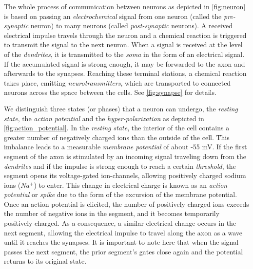 The whole process of communication between neurons as depicted in \autoref{fig:neuron} is based on passing an \emph{electrochemical} signal from one neuron (called the \emph{pre-synaptic} neuron) to many neurons (called \emph{post-synaptic} neurons). A received electrical impulse travels through the neuron and a chemical reaction is triggered to transmit the signal to the next neuron. When a signal is received at the level of the \emph{dendrites}, it is transmitted to the \emph{soma} in the form of an electrical signal. If the accumulated signal is strong enough, it may be forwarded to the axon and afterwards to the synapses. Reaching these terminal stations, a chemical reaction takes place, emitting \emph{neurotransmitters}, which are transported to connected neurons across the space between the cells. See \autoref{fig:synapse} for details.

We distinguish three states (or phases) that a neuron can undergo, the \emph{resting state}, the \emph{action potential} and the \emph{hyper-polarization} as depicted in \autoref{fig:action_potential}. In the \emph{resting state}, the interior of the cell contains a greater number of negatively charged ions than the outside of the cell. This imbalance leads to a measurable \emph{membrane potential} of about -55 mV. If the first segment of the axon is stimulated by an incoming signal traveling down from the \emph{dendrites} and if the impulse is strong enough to reach a certain \emph{threshold}, the segment opens its voltage-gated ion-channels, allowing positively charged sodium ions ($Na^{+}$) to enter. This change in electrical charge is known as an \emph{action potential} or \emph{spike} due to the form of the excursion of the membrane potential. Once an action potential is elicited, the number of positively charged ions exceeds the number of negative ions in the segment, and it becomes temporarily positively charged. As a consequence, a similar electrical change occurs in the next segment, allowing the electrical impulse to travel along the axon as a wave until it reaches the synapses. It is important to note here that when the signal passes the next segment, the prior segment's gates close again and the potential returns to its original state.



